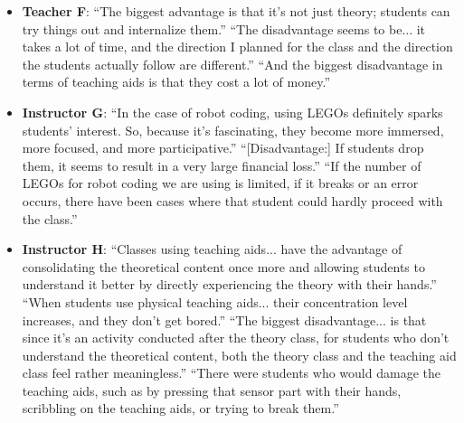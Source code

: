 \documentclass{article} %
\begin{document}
\begin{summarybox}
\begin{itemize}[itemsep=0em, topsep=0.5em, labelsep=0.5em, leftmargin=0.5em]
    \item \textbf{Teacher F}: ``The biggest advantage is that it's not just theory; students can try things out and internalize them.''  ``The disadvantage seems to be... it takes a lot of time, and the direction I planned for the class and the direction the students actually follow are different.''  ``And the biggest disadvantage in terms of teaching aids is that they cost a lot of money.''
    \item \textbf{Instructor G}: ``In the case of robot coding, using LEGOs definitely sparks students' interest. So, because it's fascinating, they become more immersed, more focused, and more participative.''  ``[Disadvantage:] If students drop them, it seems to result in a very large financial loss.''  ``If the number of LEGOs for robot coding we are using is limited, if it breaks or an error occurs, there have been cases where that student could hardly proceed with the class.''
    \item \textbf{Instructor H}: ``Classes using teaching aids... have the advantage of consolidating the theoretical content once more and allowing students to understand it better by directly experiencing the theory with their hands.''  ``When students use physical teaching aids... their concentration level increases, and they don't get bored.''  ``The biggest disadvantage... is that since it's an activity conducted after the theory class, for students who don't understand the theoretical content, both the theory class and the teaching aid class feel rather meaningless.''  ``There were students who would damage the teaching aids, such as by pressing that sensor part with their hands, scribbling on the teaching aids, or trying to break them.'' 
\end{itemize}
\end{summarybox}
\end{document}
